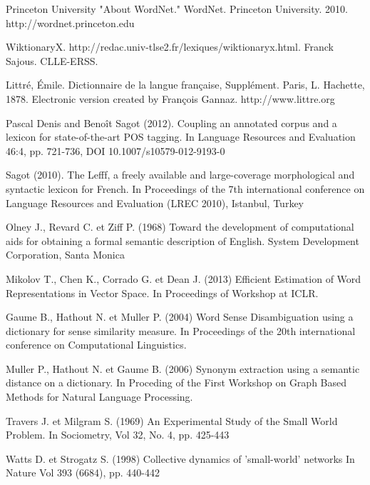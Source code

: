 \begin{thebibliography}{10}

Princeton University "About WordNet." WordNet. Princeton 
University. 2010. http://wordnet.princeton.edu \label{bib:wordnet}

WiktionaryX. 
http://redac.univ-tlse2.fr/lexiques/wiktionaryx.html. 
Franck Sajous. CLLE-ERSS. \label{bib:wikixml}

Littré, Émile. Dictionnaire de la langue française, 
Supplément. Paris, L. Hachette, 1878. Electronic version created by François 
Gannaz. http://www.littre.org \label{bib:littrexml}

Pascal Denis and Benoît Sagot (2012). Coupling an annotated 
corpus and a lexicon for state-of-the-art POS tagging. In Language Resources 
and Evaluation 46:4, pp. 721-736, DOI 10.1007/s10579-012-9193-0\label{bib:melt} 

Sagot (2010). The Lefff, a freely available and large-coverage 
morphological and syntactic lexicon for French. In Proceedings of the 7th 
international conference on Language Resources and Evaluation (LREC 2010), 
Istanbul, Turkey\label{bib:lefff} 

Olney J., Revard C. et Ziff P. (1968) Toward the development
 of computational aids for obtaining a formal semantic description of English.
System Development Corporation, Santa Monica\label{bib:olnyetal} 


Mikolov T., Chen K., Corrado G. et Dean J. (2013)
Efficient Estimation of Word Representations in Vector Space. In
Proceedings of Workshop at ICLR.\label{bib:word2vec} 

Gaume B., Hathout N. et Muller P. (2004)
Word Sense Disambiguation using a dictionary for sense similarity measure.
In Proceedings of the 20th international conference on Computational
Linguistics.\label{bib:gaumeetal} 

Muller P., Hathout N. et Gaume B. (2006)
Synonym extraction using a semantic distance on a dictionary.
In Proceding of the First Workshop on Graph Based Methods for
Natural Language Processing.\label{bib:mulleretal} 

Travers J. et Milgram S. (1969)
An Experimental Study of the Small World Problem.
In Sociometry, Vol 32, No. 4, pp. 425-443\label{bib:traversmilgram} 

Watts D. et Strogatz S. (1998)
Collective dynamics of 'small-world' networks
In Nature Vol 393 (6684), pp. 440-442 \label{bib:wattsstrogatz} 


\end{thebibliography}
